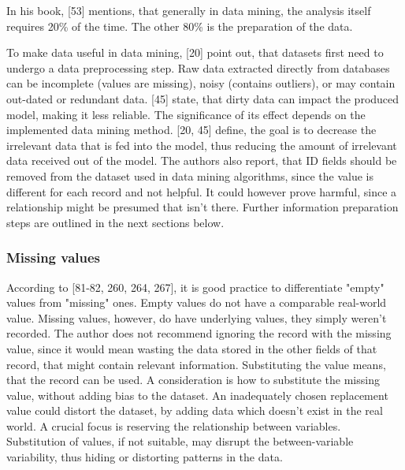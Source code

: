 In his book, \textcite{mccue2014data}[53] mentions, that generally in data mining, the analysis itself requires 20\% of the time. The other 80\% is the preparation of the data.

To make data useful in data mining, \textcite{DataMiningAndPredictiveAnalytics}[20] point out, that datasets first need to undergo a data preprocessing step. Raw data extracted directly from databases can be incomplete (values are missing), noisy (contains outliers), or may contain out-dated or redundant data. \textcite{dataPreprocessingInDataMining}[45] state, that dirty data can impact the produced model, making it less reliable. The significance of its effect depends on the implemented data mining method. \textcite{DataMiningAndPredictiveAnalytics}[20, 45] define, the goal is to decrease the irrelevant data that is fed into the model, thus reducing the amount of irrelevant data received out of the model. The authors also report, that ID fields should be removed from the dataset used in data mining algorithms, since the value is different for each record and not helpful. It could however prove harmful, since a relationship might be presumed that isn't there. Further information preparation steps are outlined in the next sections below.



\subsubsection{Missing values}
\label{section:MissingValues}

According to \textcite{dataPreparationForDataMining}[81-82, 260, 264, 267], it is good practice to differentiate "empty" values from "missing" ones. Empty values do not have a comparable real-world value. Missing values, however, do have underlying values, they simply weren't recorded. The author does not recommend ignoring the record with the missing value, since it would mean wasting the data stored in the other fields of that record, that might contain relevant information. Substituting the value means, that the record can be used. A consideration is how to substitute the missing value, without adding bias to the dataset. An inadequately chosen replacement value could distort the dataset, by adding data which doesn't exist in the real world. A crucial focus is reserving the relationship between variables. Substitution of values, if not suitable, may disrupt the between-variable variability, thus hiding or distorting patterns in the data. 


